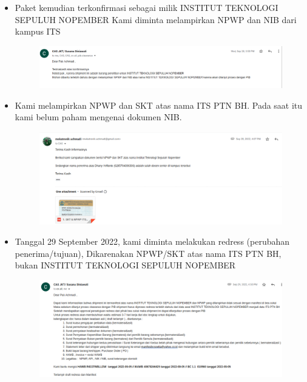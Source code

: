 \documentclass{article} %
\begin{document}
\begin{itemize}
		\item Paket kemudian terkonfirmasi sebagai milik INSTITUT TEKNOLOGI SEPULUH NOPEMBER
		Kami diminta melampirkan NPWP dan NIB dari kampus ITS

		\begin{figure}[!ht]
			\centering
			\includegraphics[width=400pt]{images/impor_6}
		\end{figure}

		\newpage
		\item Kami melampirkan NPWP dan SKT atas nama ITS PTN BH.
		Pada saat itu kami belum paham mengenai dokumen NIB.

		\begin{figure}[!ht]
			\centering
			\includegraphics[width=400pt]{images/impor_7}
		\end{figure}

		\item Tanggal 29 September 2022, kami diminta melakukan redress (perubahan penerima/tujuan),
		Dikarenakan NPWP/SKT atas nama ITS PTN BH, bukan INSTITUT TEKNOLOGI SEPULUH NOPEMBER

		\begin{figure}[!ht]
			\centering
			\includegraphics[width=400pt]{images/impor_8}
		\end{figure}


\end{itemize}
\end{document}
